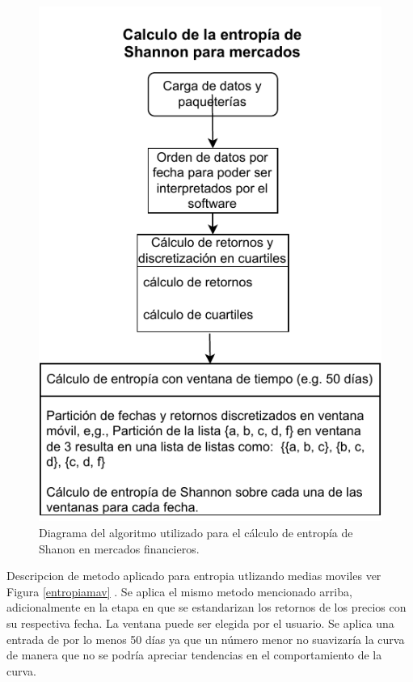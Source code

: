 \begin{figure}
	\includegraphics[width=0.7\linewidth]{figures/diagrama_entropia1}
	\caption{Diagrama del algoritmo utilizado para el c\'alculo de entrop\'ia de Shanon en mercados financieros.}
	\label{diagramaentropia1}
\end{figure}


Descripcion de metodo aplicado para entropia utlizando medias moviles ver Figura \ref{entropiamav} . 
Se aplica el mismo metodo mencionado arriba, adicionalmente en la etapa en que se estandarizan los retornos de los precios con su respectiva fecha. La ventana puede ser elegida por el usuario. Se aplica una entrada de por lo menos 50 días ya que un número menor no suavizaría la curva de manera que no se podría apreciar tendencias en el comportamiento de la curva.





